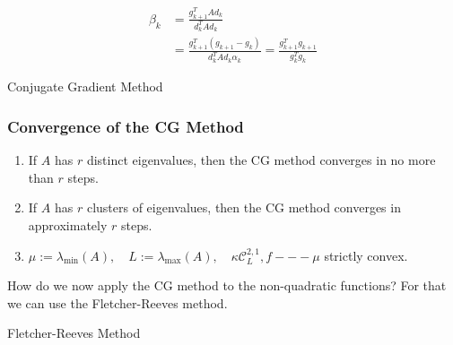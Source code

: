 \begin{align*}
    \beta_k &= \frac{g_{k+1}^T A d_k}{d_k^T A d_k} \\ 
    &= \frac{g_{k+1}^T (g_{k+1} - g_k)}{d_k^T A d_k \alpha_k} = \boxed{\frac{g_{k+1}^T g_{k+1}}{g_k^T g_k}}
\end{align*}

\begin{algorithm}
    \caption{Conjugate Gradient Method}
    \begin{algorithmic}[1]
        \EndIf
    \EndFor
    \end{algorithmic}
\end{algorithm}

\subsubsection{Convergence of the CG Method}

\begin{enumerate}
    \item If $A$ has $r$ distinct eigenvalues, then the CG method converges in no more than $r$ steps.
    \item If $A$ has $r$ clusters of eigenvalues, then the CG method converges in approximately $r$ steps.
    \item $\mu := \lambda_{\min}(A), \quad L := \lambda_{\max}(A), \quad \kappa \mathcal{C}_{L}^{2,1}, f --- \mu$ strictly convex.
\end{enumerate}

How do we now apply the CG method to the non-quadratic functions? For that we can use the Fletcher-Reeves method.

\begin{algorithm}
    \caption{Fletcher-Reeves Method}
    \begin{algorithmic}[1]
        \EndIf
    \EndFor
    \end{algorithmic}
\end{algorithm}

